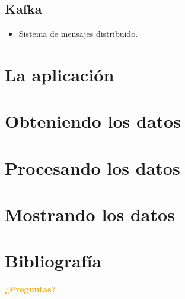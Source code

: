 \documentclass{beamer}
\begin{document}
	\subsection{Kafka}
	
	\begin{frame}
		\begin{itemize}
			\item Sistema de mensajes distribuido.
		\end{itemize}
	\end{frame}
	
	\section{La aplicación}
	
	\section{Obteniendo los datos}
	
	\section{Procesando los datos}
	
	\section{Mostrando los datos}
	
	\section{Bibliografía}
	
	\begin{frame}[plain]
		\begin{center}
			\textcolor{orange}{\textbf{¿Preguntas?}}
		\end{center}
	\end{frame}
	
	
\end{document}
